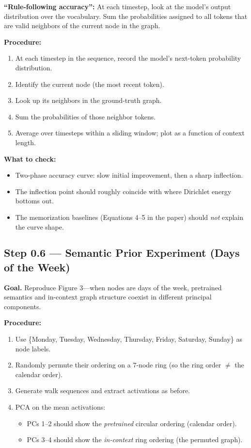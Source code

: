 \documentclass[11pt]{article}
\begin{document}
\textbf{``Rule-following accuracy'':} At each timestep, look at the model's output distribution over the vocabulary. Sum the probabilities assigned to all tokens that are valid neighbors of the current node in the graph.

\textbf{Procedure:}
\begin{enumerate}
    \item At each timestep in the sequence, record the model's next-token probability distribution.
    \item Identify the current node (the most recent token).
    \item Look up its neighbors in the ground-truth graph.
    \item Sum the probabilities of those neighbor tokens.
    \item Average over timesteps within a sliding window; plot as a function of context length.
\end{enumerate}

\textbf{What to check:}
\begin{itemize}
    \item Two-phase accuracy curve: slow initial improvement, then a sharp inflection.
    \item The inflection point should roughly coincide with where Dirichlet energy bottoms out.
    \item The memorization baselines (Equations 4--5 in the paper) should \emph{not} explain the curve shape.
\end{itemize}

\subsection{Step 0.6 --- Semantic Prior Experiment (Days of the Week)}

\textbf{Goal.} Reproduce Figure 3---when nodes are days of the week, pretrained semantics and in-context graph structure coexist in different principal components.

\textbf{Procedure:}
\begin{enumerate}
    \item Use \{Monday, Tuesday, Wednesday, Thursday, Friday, Saturday, Sunday\} as node labels.
    \item Randomly permute their ordering on a 7-node ring (so the ring order $\neq$ the calendar order).
    \item Generate walk sequences and extract activations as before.
    \item PCA on the mean activations:
    \begin{itemize}
        \item PCs 1--2 should show the \emph{pretrained} circular ordering (calendar order).
        \item PCs 3--4 should show the \emph{in-context} ring ordering (the permuted graph).
    \end{itemize}
\end{enumerate}
\end{document}
